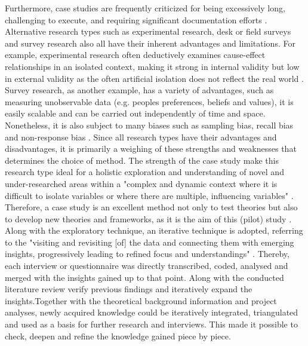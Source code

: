 Furthermore, case studies are frequently criticized for being excessively long, challenging to execute, and requiring significant documentation efforts \autocite{yinCaseStudyResearch1984}. Alternative research types such as experimental research, desk or field surveys and survey research also all have their inherent advantages and limitations. For example, experimental research often deductively examines cause-effect relationships in an isolated context, making it strong in internal validity but low in external validity as the often artificial isolation does not reflect the real world \autocite{pelzResearchMethodsSocial}. Survey research, as another example, has a variety of advantages, such as measuring unobservable data (e.g. peoples preferences, beliefs and values), it is easily scalable and can be carried out independently of time and space. Nonetheless, it is also subject to many biases such as sampling bias, recall bias and non-response bias \autocite{pelzResearchMethodsSocial}.
Since all research types have their advantages and disadvantages, it is primarily a weighing of these strengths and weaknesses that determines the choice of method. The strength of the case study make this research type ideal for a holistic exploration and understanding of novel and under-researched areas within a "complex and dynamic context where it is difficult to isolate variables or where there are multiple, influencing variables" \autocites[2]{fitzgeraldCaseStudiesResearch1999}{zainalCaseStudyResearch2007}. Therefore, a case study is an excellent method not only to test theories but also to develop new theories and frameworks, as it is the aim of this (pilot) study \autocite{pelzResearchMethodsSocial, zainalCaseStudyResearch2007}. \linebreak[1]
Along with the exploratory technique, an iterative technique is adopted, referring to the "visiting and revisiting [of] the data and connecting them with emerging insights, progressively leading to refined focus and understandings" \autocite[77]{srivastavaPracticalIterativeFramework2009}. Thereby, each interview or questionnaire was directly transcribed, coded, analysed and merged with the insights gained up to that point. Along with the conducted literature review verify previous findings and iteratively expand the insights.Together with the theoretical background information and project analyses, newly acquired knowledge could be iteratively integrated, triangulated and used as a basis for further research and interviews. This made it possible to check, deepen and refine the knowledge gained piece by piece.
